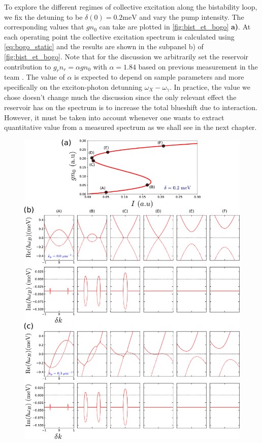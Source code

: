 To explore the different regimes of collective excitation along the bistability loop, we fix the detuning to be $\delta(0)=0.2 \mathrm{meV}$ and vary the pump intensity. The corresponding
values that $gn_0$ can take are plotted in \autoref{fig:bist_et_bogo} \textbf{a)}. At each operating point the collective excitation spectrum is calculated using \autoref{eq:bogo_static} and the results are shown in the subpanel b) of \autoref{fig:bist_et_bogo}.
Note that for the discussion we arbitrarily set the reservoir contribution to $g_rn_r=\alpha gn_0$ with $\alpha=1.84$ based on previous measurement in the team \cite{claude_phd}. The value of $\alpha$ is expected to depend on sample parameters and more specifically on the exciton-photon detunning $\omega_X-\omega_\gamma$. In practice, the value we chose doesn't change much the discussion since the only relevant effect the reservoir has on the spectrum is to increase the total blueshift 
due to interaction. However, it must be taken into account whenever one wants to extract quantitative value from a measured spectrum as we shall see in the next chapter.
\begin{figure}[!htbp]
    \centering
    \includegraphics[width=1\textwidth]{chap_AG_theory/fig/bist_et_bogo.pdf}
   \label{fig:bist_et_bogo}
\end{figure}
